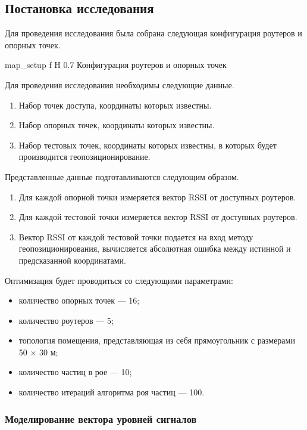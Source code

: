 \subsection{Постановка исследования}

Для проведения исследования была собрана следующая конфигурация роутеров и опорных точек.

    {map_setup}
    {f}
    {H}
    {0.7\linewidth}
    {Конфигурация роутеров и опорных точек}

Для проведения исследования необходимы следующие данные.

\begin{enumerate}
    \item Набор точек доступа, координаты которых известны.
    \item Набор опорных точек, координаты которых известны.
    \item Набор тестовых точек, координаты которых известны, в которых будет производится геопозиционирование.
\end{enumerate}

Представленные данные подготавливаются следующим образом.
\begin{enumerate}
    \item Для каждой опорной точки измеряется вектор RSSI от доступных роутеров.
    \item Для каждой тестовой точки измеряется вектор RSSI от доступных роутеров.
    \item Вектор RSSI от каждой тестовой точки подается на вход методу геопозиционирования, вычисляется абсолютная ошибка между истинной и предсказанной координатами.
\end{enumerate}

Оптимизация будет проводиться со следующими параметрами:
\begin{itemize}[label=---]
    \item количество опорных точек --- 16;
    \item количество роутеров --- 5;
    \item топология помещения, представляющая из себя прямоугольник с размерами 50 $\times$ 30 м;
    \item количество частиц в рое --- 10;
    \item количество итераций алгоритма роя частиц --- 100.
\end{itemize}

\subsubsection{Моделирование вектора уровней сигналов}

